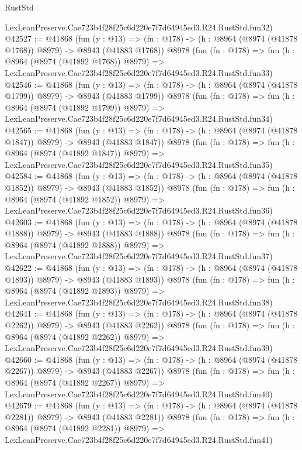 \begin{lexlean}{RustStd}
\begin{coremodule}
    LexLeanPreserve.Cae723b4f28f25c6d220e7f7d64945ed3.R24.RustStd.fun32)
@42527 := @41868
    (fun (y : @13) =>
    (fn : @178) -> (h : @8964 (@8974 (@41878 @1768)) @8979) -> @8943 (@41883 @1768))
    @8978
    (fun (fn : @178) =>
    fun (h : @8964 (@8974 (@41892 @1768)) @8979) =>
    LexLeanPreserve.Cae723b4f28f25c6d220e7f7d64945ed3.R24.RustStd.fun33)
@42546 := @41868
    (fun (y : @13) =>
    (fn : @178) -> (h : @8964 (@8974 (@41878 @1799)) @8979) -> @8943 (@41883 @1799))
    @8978
    (fun (fn : @178) =>
    fun (h : @8964 (@8974 (@41892 @1799)) @8979) =>
    LexLeanPreserve.Cae723b4f28f25c6d220e7f7d64945ed3.R24.RustStd.fun34)
@42565 := @41868
    (fun (y : @13) =>
    (fn : @178) -> (h : @8964 (@8974 (@41878 @1847)) @8979) -> @8943 (@41883 @1847))
    @8978
    (fun (fn : @178) =>
    fun (h : @8964 (@8974 (@41892 @1847)) @8979) =>
    LexLeanPreserve.Cae723b4f28f25c6d220e7f7d64945ed3.R24.RustStd.fun35)
@42584 := @41868
    (fun (y : @13) =>
    (fn : @178) -> (h : @8964 (@8974 (@41878 @1852)) @8979) -> @8943 (@41883 @1852))
    @8978
    (fun (fn : @178) =>
    fun (h : @8964 (@8974 (@41892 @1852)) @8979) =>
    LexLeanPreserve.Cae723b4f28f25c6d220e7f7d64945ed3.R24.RustStd.fun36)
@42603 := @41868
    (fun (y : @13) =>
    (fn : @178) -> (h : @8964 (@8974 (@41878 @1888)) @8979) -> @8943 (@41883 @1888))
    @8978
    (fun (fn : @178) =>
    fun (h : @8964 (@8974 (@41892 @1888)) @8979) =>
    LexLeanPreserve.Cae723b4f28f25c6d220e7f7d64945ed3.R24.RustStd.fun37)
@42622 := @41868
    (fun (y : @13) =>
    (fn : @178) -> (h : @8964 (@8974 (@41878 @1893)) @8979) -> @8943 (@41883 @1893))
    @8978
    (fun (fn : @178) =>
    fun (h : @8964 (@8974 (@41892 @1893)) @8979) =>
    LexLeanPreserve.Cae723b4f28f25c6d220e7f7d64945ed3.R24.RustStd.fun38)
@42641 := @41868
    (fun (y : @13) =>
    (fn : @178) -> (h : @8964 (@8974 (@41878 @2262)) @8979) -> @8943 (@41883 @2262))
    @8978
    (fun (fn : @178) =>
    fun (h : @8964 (@8974 (@41892 @2262)) @8979) =>
    LexLeanPreserve.Cae723b4f28f25c6d220e7f7d64945ed3.R24.RustStd.fun39)
@42660 := @41868
    (fun (y : @13) =>
    (fn : @178) -> (h : @8964 (@8974 (@41878 @2267)) @8979) -> @8943 (@41883 @2267))
    @8978
    (fun (fn : @178) =>
    fun (h : @8964 (@8974 (@41892 @2267)) @8979) =>
    LexLeanPreserve.Cae723b4f28f25c6d220e7f7d64945ed3.R24.RustStd.fun40)
@42679 := @41868
    (fun (y : @13) =>
    (fn : @178) -> (h : @8964 (@8974 (@41878 @2281)) @8979) -> @8943 (@41883 @2281))
    @8978
    (fun (fn : @178) =>
    fun (h : @8964 (@8974 (@41892 @2281)) @8979) =>
    LexLeanPreserve.Cae723b4f28f25c6d220e7f7d64945ed3.R24.RustStd.fun41)

\end{coremodule}
\end{lexlean}
